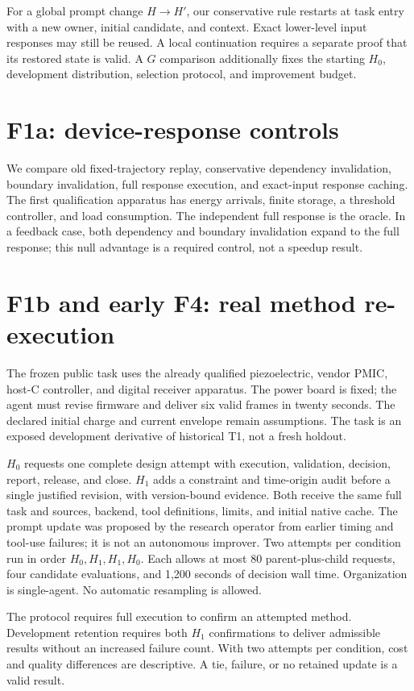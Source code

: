 \documentclass[10pt]{article}
\begin{document}
For a global prompt change $H\to H'$, our conservative rule restarts at task entry
with a new owner, initial candidate, and context. Exact lower-level input responses
may still be reused. A local continuation requires a separate proof that its
restored state is valid. A $G$ comparison additionally fixes the starting $H_0$,
development distribution, selection protocol, and improvement budget.

\section{F1a: device-response controls}
We compare old fixed-trajectory replay, conservative dependency invalidation,
boundary invalidation, full response execution, and exact-input response caching.
The first qualification apparatus has energy arrivals, finite storage, a threshold
controller, and load consumption. The independent full response is the oracle.
In a feedback case, both dependency and boundary invalidation expand to the full
response; this null advantage is a required control, not a speedup result.


\section{F1b and early F4: real method re-execution}
The frozen public task uses the already qualified piezoelectric, vendor PMIC,
host-C controller, and digital receiver apparatus. The power board is fixed; the
agent must revise firmware and deliver six valid frames in twenty seconds.
The declared initial charge and current envelope remain assumptions. The task is
an exposed development derivative of historical T1, not a fresh holdout.

$H_0$ requests one complete design attempt with execution, validation, decision,
report, release, and close. $H_1$ adds a constraint and time-origin audit before a
single justified revision, with version-bound evidence. Both receive the same
full task and sources, backend, tool definitions, limits, and initial native cache.
The prompt update was proposed by the research operator from earlier timing and
tool-use failures; it is not an autonomous improver. Two attempts per condition run
in order $H_0,H_1,H_1,H_0$. Each allows at most 80 parent-plus-child requests,
four candidate evaluations, and 1,200 seconds of decision wall time. Organization
is single-agent. No automatic resampling is allowed.

The protocol requires full execution to confirm an attempted method. Development retention requires
both $H_1$ confirmations to deliver admissible results without an increased
failure count. With two attempts per condition, cost and quality differences are
descriptive. A tie, failure, or no retained update is a valid result.

\end{document}

